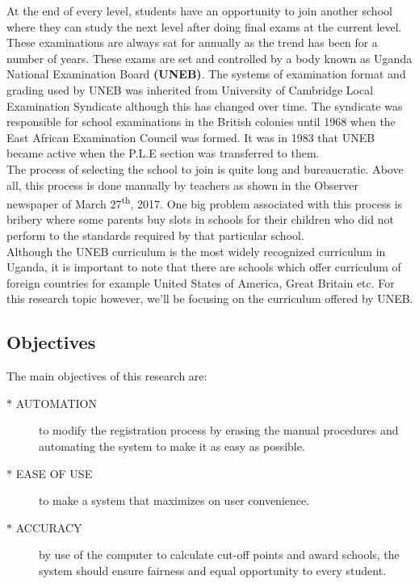\documentclass {article}
\begin{document}
At the end of every level, students have an opportunity to join another school where they can study the next level after doing final exams at the current level. These examinations are always sat for annually as the trend has been for a number of years. These exams are set and controlled by a body known as Uganda National Examination Board \textbf{(UNEB)}. \cite{article} The systems of examination format and grading used by UNEB was inherited from University of Cambridge Local Examination Syndicate although this has changed over time. The syndicate was responsible for school examinations in the British colonies until 1968 when the East African Examination Council was formed. It was in 1983 that UNEB became active when the P.L.E section was transferred to them.  \\ 

The process of selecting the school to join is quite long and bureaucratic. Above all, this process is done manually by teachers as shown in the Observer newspaper of March 27\textsuperscript{th}, 2017.\cite{article2} One big problem associated with this process is bribery where some parents buy slots in schools for their children who did not perform to the standards required by that particular school. \\

Although the UNEB curriculum is the most widely recognized curriculum in Uganda, it is important to note that there are schools which offer curriculum of foreign countries for example United States of America, Great Britain etc. For this research topic however, we’ll be focusing on the curriculum offered by UNEB. \\

\subsection{Objectives}

The main objectives of this research are:\\

\begin{description}
  \item[$\ast$ AUTOMATION] to modify the registration process by erasing the manual procedures and automating the system to make it as easy as possible.
  \item[$\ast$ EASE OF USE] to make a system that maximizes on user convenience.
  \item[$\ast$ ACCURACY] by use of the computer to calculate cut-off points and award schools, the system should ensure fairness and equal opportunity to every student.
\end{description}
\end{document}
